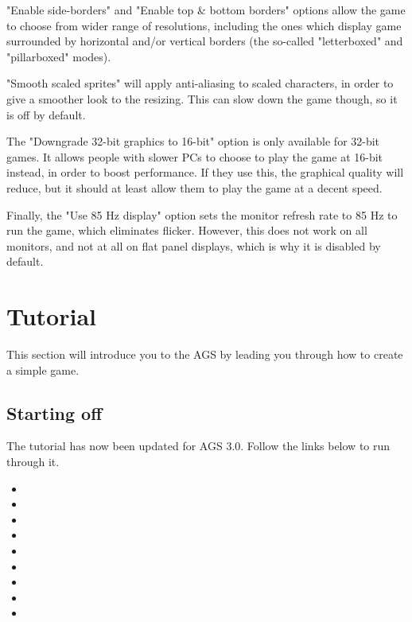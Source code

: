 "Enable side-borders" and "Enable top & bottom borders" options allow the game to
choose from wider range of resolutions, including the ones which display game surrounded
by horizontal and/or vertical borders (the so-called "letterboxed" and "pillarboxed" modes).

"Smooth scaled sprites" will apply anti-aliasing to scaled characters, in order to
give a smoother look to the resizing. This can slow down the game though, so it is off
by default.

The "Downgrade 32-bit graphics to 16-bit" option is only available for 32-bit games.
It allows people with slower PCs to choose to play the game at 16-bit instead, in order
to boost performance. If they use this, the graphical quality will reduce, but it should at
least allow them to play the game at a decent speed.

Finally, the "Use 85 Hz display" option sets the monitor refresh rate to 85 Hz to run the game,
which eliminates flicker. However, this does not work on all monitors, and not at all on flat
panel displays, which is why it is disabled by default.


\chapter{Tutorial}%

This section will introduce you to the AGS by leading you through how to
create a simple game.

\section{Starting off}\label{StartingOff}%

The tutorial has now been updated for AGS 3.0. Follow the links below
to run through it.

\begin{itemize}
\item {}
\item {}
\item {}
\item {}
\item {}
\item {}
\item {}
\item {}
\item {}
\end{itemize}

